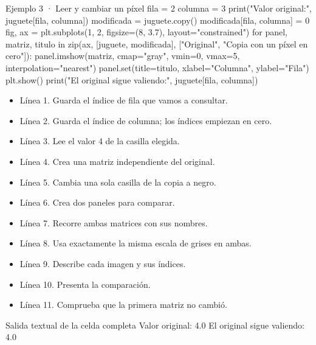 \begin{Codigo}{Ejemplo 3 · Leer y cambiar un píxel}
fila = 2
columna = 3
print("Valor original:", juguete[fila, columna])
modificada = juguete.copy()
modificada[fila, columna] = 0
fig, ax = plt.subplots(1, 2, figsize=(8, 3.7), layout="constrained")
for panel, matriz, titulo in zip(ax, [juguete, modificada], ["Original", "Copia con un píxel en cero"]):
    panel.imshow(matriz, cmap="gray", vmin=0, vmax=5, interpolation="nearest")
    panel.set(title=titulo, xlabel="Columna", ylabel="Fila")
plt.show()
print("El original sigue valiendo:", juguete[fila, columna])
\end{Codigo}


\begin{itemize}

\item Línea 1. Guarda el índice de fila que vamos a consultar.

\item Línea 2. Guarda el índice de columna; los índices empiezan en cero.

\item Línea 3. Lee el valor 4 de la casilla elegida.

\item Línea 4. Crea una matriz independiente del original.

\item Línea 5. Cambia una sola casilla de la copia a negro.

\item Línea 6. Crea dos paneles para comparar.

\item Línea 7. Recorre ambas matrices con sus nombres.

\item Línea 8. Usa exactamente la misma escala de grises en ambas.

\item Línea 9. Describe cada imagen y sus índices.

\item Línea 10. Presenta la comparación.

\item Línea 11. Comprueba que la primera matriz no cambió.

\end{itemize}

\begin{Salida}{Salida textual de la celda completa}
Valor original: 4.0
El original sigue valiendo: 4.0
\end{Salida}

